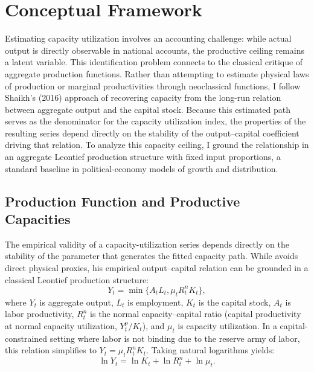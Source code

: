 \section{Conceptual Framework}
\label{sec:conceptual_framework}

Estimating capacity utilization involves an accounting challenge: while actual output is directly observable in national accounts, the productive ceiling remains a latent variable. This identification problem connects to the classical critique of aggregate production functions. Rather than attempting to estimate physical laws of production or marginal productivities through neoclassical functions, I follow Shaikh's (2016) approach of recovering capacity from the long-run relation between aggregate output and the capital stock. Because this estimated path serves as the denominator for the capacity utilization index, the properties of the resulting series depend directly on the stability of the output--capital coefficient driving that relation. To analyze this capacity ceiling, I ground the relationship in an aggregate Leontief production structure with fixed input proportions, a standard baseline in political-economy models of growth and distribution.

\subsection{Production Function and Productive Capacities}
\label{subsec:coefficient_capacity_path}

The empirical validity of a capacity-utilization series depends directly on the stability of the parameter that generates the fitted capacity path. While \citet{Shaikh2016} avoids direct physical proxies, his empirical output--capital relation can be grounded in a classical Leontief production structure:
\begin{equation}
Y_t = \min \{ A_t L_t, \mu_t R^n_t K_t \},
\end{equation}
where $Y_t$ is aggregate output, $L_t$ is employment, $K_t$ is the capital stock, $A_t$ is labor productivity, $R^n_t$ is the normal capacity--capital ratio (capital productivity at normal capacity utilization, $Y^p_t / K_t$), and $\mu_t$ is capacity utilization. In a capital-constrained setting where labor is not binding due to the reserve army of labor, this relation simplifies to $Y_t = \mu_t R^n_t K_t$. Taking natural logarithms yields:
\begin{equation}
\ln Y_t = \ln K_t + \ln R^n_t + \ln \mu_t.
\end{equation}

